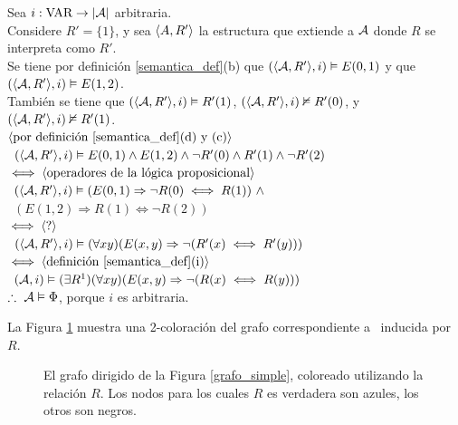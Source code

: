 \begin{enumerate}
Sea $i : \text{VAR} \rightarrow |\mathcal{A}|$ arbitraria.\\
Considere $R' = \{1\}$, y sea $\langle A, R' \rangle$ la estructura que extiende a $\mathcal{A}$
donde $R$ se interpreta como $R'$.\\
Se tiene por definición \ref{semantica_def}(b) que $(\langle \mathcal{A}, R' \rangle,i) 
\vDash E(0,1)$ y que \mbox{$(\langle \mathcal{A}, R' \rangle,i) \vDash E(1,2)$}.\\
También se tiene que $(\langle \mathcal{A}, R' \rangle, i) \vDash R'(1)$, 
$(\langle \mathcal{A}, R' \rangle, i) \nvDash R'(0)$, y $(\langle \mathcal{A}, R' \rangle, i) \nvDash R'(1)$.\\
$\langle \text{por definición \ref{semantica_def}(d) y (c)} \rangle$\\
\mbox{\hspace{5mm} $(\langle \mathcal{A}, R' \rangle, i) \vDash E(0,1) \land E(1,2) \land \neg
R'(0) \land R'(1) \land \neg R'(2)$}\\
$\iff \langle \text{operadores de la lógica proposicional} \rangle$\\
\mbox{\hspace{5mm} $(\langle \mathcal{A}, R' \rangle, i) \vDash (E(0,1) \Rightarrow \neg R(0)
\iff R(1))\ \land$} \\ 
\mbox{\hspace{30mm} $(E(1,2) \Rightarrow R(1) \iff \neg R(2))$}\\
$\iff \langle \text{?} \rangle$\\
\mbox{\hspace{5mm} $(\langle \mathcal{A}, R' \rangle, i) 
\vDash (\forall xy)(E(x, y) \Rightarrow \neg(R'(x) \iff R'(y)))$}\\
$\iff \langle \text{definición \ref{semantica_def}(i)} \rangle$\\
\mbox{\hspace{5mm} $(\mathcal{A}, i) 
\vDash (\exists R^1)(\forall xy)(E(x, y) \Rightarrow \neg(R(x) \iff R(y)))$}\\
$\therefore\ \mathcal{A} \vDash \Phi$, porque $i$ es arbitraria.
\end{enumerate}

La Figura \ref{grafo_coloreado} muestra una 2-coloración del grafo correspondiente a \A
\ inducida por $R$.

\begin{figure}[h]
\begin{center}
\end{center}
\caption[Grafo dirigido coloreado por una relación]{El grafo dirigido de la Figura \ref{grafo_simple}, coloreado
utilizando la relación $R$. Los nodos para los cuales $R$ es verdadera son
azules, los otros son negros.}
\label{grafo_coloreado}
\end{figure}

